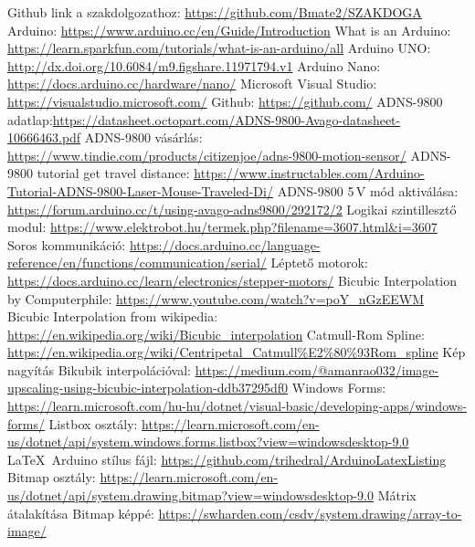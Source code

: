\documentclass[]{thesis-ekf}
\theoremstyle{definition}
\theoremstyle{remark}
\begin{document}
\begin{thebibliography}{9}
 Github link a szakdolgozathoz: \url{https://github.com/Bmate2/SZAKDOGA}
 Arduino: \url{https://www.arduino.cc/en/Guide/Introduction}
 What is an Arduino: \url{https://learn.sparkfun.com/tutorials/what-is-an-arduino/all}
 Arduino UNO: \url{http://dx.doi.org/10.6084/m9.figshare.11971794.v1}
 Arduino Nano: \url{https://docs.arduino.cc/hardware/nano/}
 Microsoft Visual Studio: \url{https://visualstudio.microsoft.com/}
 Github: \url{https://github.com/}
 ADNS-9800 adatlap:\url{https://datasheet.octopart.com/ADNS-9800-Avago-datasheet-10666463.pdf}
 ADNS-9800 vásárlás: \url{https://www.tindie.com/products/citizenjoe/adns-9800-motion-sensor/}
 ADNS-9800 tutorial get travel distance: \url{https://www.instructables.com/Arduino-Tutorial-ADNS-9800-Laser-Mouse-Traveled-Di/}
 ADNS-9800 5\,V mód aktiválása: \url{https://forum.arduino.cc/t/using-avago-adns9800/292172/2}
 Logikai szintillesztő modul: \url{https://www.elektrobot.hu/termek.php?filename=3607.html&i=3607}
 Soros kommunikáció: \url{https://docs.arduino.cc/language-reference/en/functions/communication/serial/}
 Léptető motorok: \url{https://docs.arduino.cc/learn/electronics/stepper-motors/}
 Bicubic Interpolation by Computerphile: \url{https://www.youtube.com/watch?v=poY_nGzEEWM}
 Bicubic Interpolation from wikipedia: \url{https://en.wikipedia.org/wiki/Bicubic_interpolation}
 Catmull-Rom Spline: \url{https://en.wikipedia.org/wiki/Centripetal_Catmull%E2%80%93Rom_spline}
 Kép nagyítás Bikubik interpolációval: \url{https://medium.com/@amanrao032/image-upscaling-using-bicubic-interpolation-ddb37295df0}
 Windows Forms: \url{https://learn.microsoft.com/hu-hu/dotnet/visual-basic/developing-apps/windows-forms/}
 Listbox osztály: \url{https://learn.microsoft.com/en-us/dotnet/api/system.windows.forms.listbox?view=windowsdesktop-9.0}
 \LaTeX\ Arduino stílus fájl: \url{https://github.com/trihedral/ArduinoLatexListing}
 Bitmap osztály: \url{https://learn.microsoft.com/en-us/dotnet/api/system.drawing.bitmap?view=windowsdesktop-9.0}
 Mátrix átalakítása Bitmap képpé: \url{https://swharden.com/csdv/system.drawing/array-to-image/}

\end{thebibliography}
\end{document}

